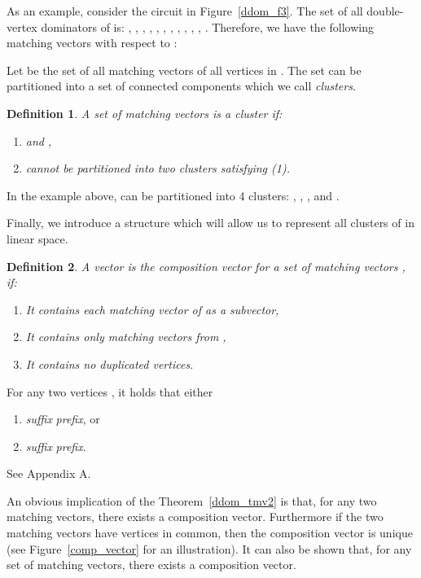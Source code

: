 \documentclass{llncs}
\newtheorem{defn}{Definition}
\begin{document}
As an example, consider the circuit in Figure~\ref{ddom_f3}.
The set of all double-vertex dominators of 
 is: , , , , ,
, , , , , ,
. 
Therefore, we have the following matching vectors with respect to :


Let  be the set of all matching vectors of all vertices in .
The set  can be partitioned into a set of connected components
which we call {\em clusters}.

\begin{defn} \label{ddom_deps}
A set of matching vectors  is a {\em cluster} if:
\begin{enumerate}
\item[(1)]
 and , 
\item[(2)]
 cannot be partitioned into two clusters satisfying (1).
\end{enumerate}
\end{defn}

In the example above,  can be partitioned into 4 clusters:
, ,
, and .

Finally, we introduce a structure  
which will allow us to represent all clusters of  in linear space.

\begin{defn} \label{ddom_comp}
A vector   is the {\em composition vector} for a set of matching vectors , if: 
\begin{enumerate}
\item It contains each matching vector of  as a subvector,
\item It contains only matching vectors from ,
\item It contains no duplicated vertices.  
\end{enumerate}
\end{defn}

\begin{theorem} \label{ddom_tmv2}
For any two vertices , it holds that either
\begin{enumerate}
\item  {\em suffix} {\em prefix}, or
\item  {\em suffix} {\em prefix}.
\end{enumerate}
\end{theorem}
  See Appendix A.

An obvious implication of the Theorem~\ref{ddom_tmv2} is that, for any two matching vectors, there exists a composition vector. Furthermore if the two matching vectors
have vertices in common, then the composition vector is unique (see Figure~\ref{comp_vector} for an illustration). It can also be shown that, 
for any set of matching vectors,  there exists a composition vector.
\end{document}
